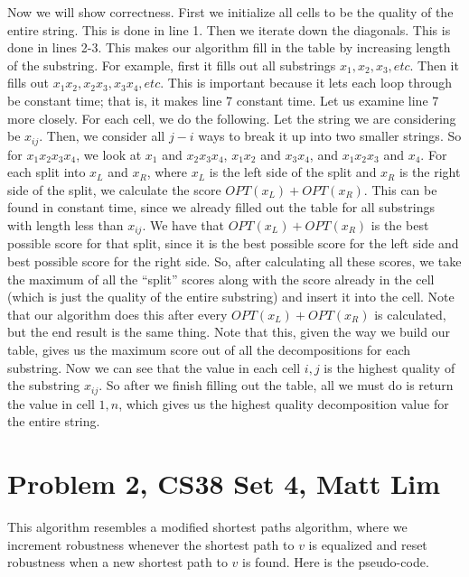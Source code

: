 \documentclass{article}
\begin{document}
Now we will show correctness. First we initialize all cells to be the quality of
the entire string. This is done in line 1. Then we iterate down the diagonals.
This is done in lines 2-3. This makes our algorithm fill in the table by
increasing length of the substring. For example, first it fills out all
substrings $x_1, x_2, x_3, etc$. Then it fills out $x_1x_2, x_2x_3, x_3x_4,
etc$. This is important because it lets each loop through be constant time; that
is, it makes line 7 constant time. Let us examine line 7 more closely. For each
cell, we do the following. Let the string we are considering be $x_{ij}$. Then,
we consider all $j-i$ ways to break it up into two smaller strings. So for
$x_1x_2x_3x_4$, we look at $x_1$ and $x_2x_3x_4$, $x_1x_2$ and $x_3x_4$, and
$x_1x_2x_3$ and $x_4$. For each split into $x_L$ and $x_R$, where $x_L$ is the
left side of the split and $x_R$ is the right side of the split, we calculate
the score $OPT(x_L) + OPT(x_R)$. This can be found in constant time, since we
already filled out the table for all substrings with length less than $x_{ij}$.
We have that $OPT(x_L) + OPT(x_R)$ is the best possible score for that split,
since it is the best possible score for the left side and best possible score
for the right side. So, after calculating all these scores, we take the maximum
of all the ``split'' scores along with the score already in the cell (which is
just the quality of the entire substring)
and insert it into the cell. Note that our algorithm does this after every
$OPT(x_L) + OPT(x_R)$ is calculated, but the end result is the same thing. Note
that this, given the way we build our table, gives us the maximum score out of
all the decompositions for each substring. Now
we can see that the value in each cell $i,j$ is the highest quality of the
substring $x_{ij}$. So after we finish filling out the table, all we must do is
return the value in cell $1,n$, which gives us the highest quality decomposition
value for the entire string.
\newpage

\section*{Problem 2, CS38 Set 4, Matt Lim}
This algorithm resembles a modified shortest paths algorithm, where we increment
robustness whenever the shortest path to $v$ is equalized and reset robustness
when a new shortest path to $v$ is found. Here is the pseudo-code.
\end{document}

